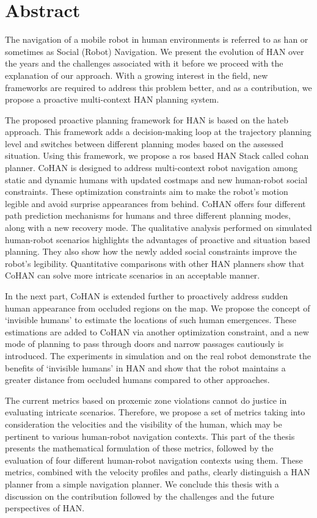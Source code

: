 \chapter*{Abstract}

The navigation of a mobile robot in human environments is referred to as \acrfull{han} or sometimes as Social (Robot) Navigation. We present the evolution of HAN over the years and the challenges associated with it before we proceed with the explanation of our approach. With a growing interest in the field, new frameworks are required to address this problem better, and as a contribution, we propose a proactive multi-context HAN planning system. 

The proposed proactive planning framework for HAN is based on the \acrfull{hateb} approach. This framework adds a decision-making loop at the trajectory planning level and switches between different planning modes based on the assessed situation. Using this framework, we propose a \acrshort{ros} based HAN Stack called \acrfull{cohan} planner. CoHAN is designed to address multi-context robot navigation among static and dynamic humans with updated costmaps and new human-robot social constraints. These optimization constraints aim to make the robot’s motion legible and avoid surprise appearances from behind. CoHAN offers four different path prediction mechanisms for humans and three different planning modes, along with a new recovery mode. The qualitative analysis performed on simulated human-robot scenarios highlights the advantages of proactive and situation based planning. They also show how the newly added social constraints improve the robot’s legibility. Quantitative comparisons with other HAN planners show that CoHAN can solve more intricate scenarios in an acceptable manner.

In the next part, CoHAN is extended further to proactively address sudden human appearance from occluded regions on the map. We propose the concept of ‘invisible humans’ to estimate the locations of such human emergences. These estimations are added to CoHAN via another optimization constraint, and a new mode of planning to pass through doors and narrow passages cautiously is introduced. The experiments in simulation and on the real robot demonstrate the benefits of ‘invisible humans’ in HAN and show that the robot maintains a greater distance from occluded humans compared to other approaches.

The current metrics based on proxemic zone violations cannot do justice in evaluating intricate scenarios. Therefore, we propose a set of metrics taking into consideration the velocities and the visibility of the human, which may be pertinent to various human-robot navigation contexts. This part of the thesis presents the mathematical formulation of these metrics, followed by the evaluation of four different human-robot navigation contexts using them. These metrics, combined with the velocity profiles and paths, clearly distinguish a HAN planner from a simple navigation planner. We conclude this thesis with a discussion on the contribution followed by the challenges and the future perspectives of HAN.




